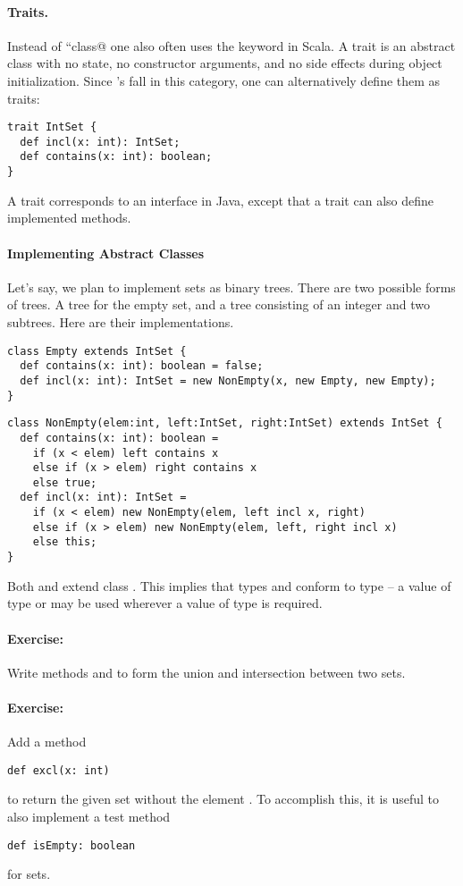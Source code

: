 \documentclass[11pt]{book}
\newcommand{\exercise}{\paragraph{Exercise:}}
\begin{document}
\paragraph{Traits.}

Instead of ``\verb@abstract class@ one also often uses the keyword
\verb@trait@ in Scala. A trait is an abstract class with no state, no
constructor arguments, and no side effects during object
initialization.  Since \verb@IntSet@'s fall in this category, one can
alternatively define them as traits:
\begin{verbatim}
trait IntSet {
  def incl(x: int): IntSet;
  def contains(x: int): boolean;
}
\end{verbatim}
A trait corresponds to an interface in Java, except
that a trait can also define implemented methods.  

\paragraph{Implementing Abstract Classes}

Let's say, we plan to implement sets as binary trees.  There are two
possible forms of trees. A tree for the empty set, and a tree
consisting of an integer and two subtrees. Here are their
implementations.

\begin{verbatim}
class Empty extends IntSet {
  def contains(x: int): boolean = false;
  def incl(x: int): IntSet = new NonEmpty(x, new Empty, new Empty);
}
\end{verbatim}

\begin{verbatim}
class NonEmpty(elem:int, left:IntSet, right:IntSet) extends IntSet {
  def contains(x: int): boolean = 
    if (x < elem) left contains x
    else if (x > elem) right contains x
    else true;
  def incl(x: int): IntSet = 
    if (x < elem) new NonEmpty(elem, left incl x, right)
    else if (x > elem) new NonEmpty(elem, left, right incl x)
    else this;
}
\end{verbatim}
Both \verb@Empty@ and \verb@NonEmpty@ extend class
\verb@IntSet@.  This implies that types \verb@Empty@ and
\verb@NonEmpty@ conform to type \verb@IntSet@ -- a value of type \verb@Empty@ or \verb@NonEmpty@ may be used wherever a value of type \verb@IntSet@ is required.

\exercise Write methods \verb@union@ and \verb@intersection@ to form
the union and intersection between two sets.

\exercise Add a method 
\begin{verbatim}
def excl(x: int)
\end{verbatim}
to return the given set without the element \verb@x@. To accomplish this,
it is useful to also implement a test method
\begin{verbatim}
def isEmpty: boolean
\end{verbatim}
for sets.
\end{document}
